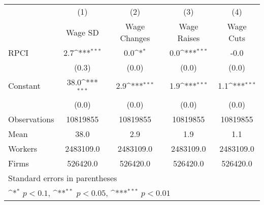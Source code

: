 {
\def\sym#1{\ifmmode^{#1}\else\(^{#1}\)\fi}
\begin{tabular}{l*{4}{c}}
\hline\hline
                    &\multicolumn{1}{c}{(1)}&\multicolumn{1}{c}{(2)}&\multicolumn{1}{c}{(3)}&\multicolumn{1}{c}{(4)}\\
                    &\multicolumn{1}{c}{Wage SD}&\multicolumn{1}{c}{Wage Changes}&\multicolumn{1}{c}{Wage Raises}&\multicolumn{1}{c}{Wage Cuts}\\
\hline
RPCI                &         2.7\sym{***}&         0.0\sym{*}  &         0.0\sym{***}&        -0.0         \\
                    &       (0.3)         &       (0.0)         &       (0.0)         &       (0.0)         \\
[1em]
Constant            &        38.0\sym{***}&         2.9\sym{***}&         1.9\sym{***}&         1.1\sym{***}\\
                    &       (0.0)         &       (0.0)         &       (0.0)         &       (0.0)         \\
\hline
Observations        &    10819855         &    10819855         &    10819855         &    10819855         \\
Mean                &        38.0         &         2.9         &         1.9         &         1.1         \\
Workers             &   2483109.0         &   2483109.0         &   2483109.0         &   2483109.0         \\
Firms               &    526420.0         &    526420.0         &    526420.0         &    526420.0         \\
\hline\hline
\multicolumn{5}{l}{\footnotesize Standard errors in parentheses}\\
\multicolumn{5}{l}{\footnotesize \sym{*} \(p<0.1\), \sym{**} \(p<0.05\), \sym{***} \(p<0.01\)}\\
\end{tabular}
}
